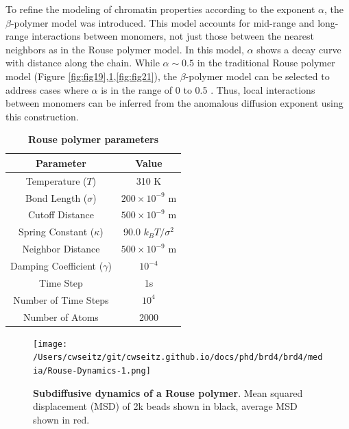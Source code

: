 To refine the modeling of chromatin properties according to the exponent $\alpha$, the $\beta$-polymer model was introduced. This model accounts for mid-range and long-range interactions between monomers, not just those between the nearest neighbors as in the Rouse polymer model. In this model, $\alpha$ shows a decay curve with distance along the chain. While $\alpha \sim 0.5$ in the traditional Rouse polymer model (Figure \ref{fig:fig19},\ref{fig:fig20},\ref{fig:fig21}), the $\beta$-polymer model can be selected to address cases where $\alpha$ is in the range of 0 to 0.5 \parencite{Amitai2013,Amitai2017,Hajjoul2013}. Thus, local interactions between monomers can be inferred from the anomalous diffusion exponent using this construction.

\begin{table}[h!]
\centering
\begin{tabular}{|c|c|}
\hline
\textbf{Parameter} & \textbf{Value} \\ \hline
Temperature ($T$) & 310 K \\ \hline
Bond Length ($\sigma$) & $200 \times 10^{-9}$ m \\ \hline
Cutoff Distance & $500 \times 10^{-9}$ m \\ \hline
Spring Constant ($\kappa$) & 90.0 $k_{B}T/\sigma^2$ \\ \hline
Neighbor Distance & $500 \times 10^{-9}$ m \\ \hline
Damping Coefficient ($\gamma$) & $10^{-4}$ \\ \hline
Time Step & 1s\\ \hline
Number of Time Steps & $10^4$ \\ \hline
Number of Atoms & 2000 \\ \hline
\end{tabular}
\caption{\textbf{Rouse polymer parameters}}
\end{table}

\begin{figure}[t]
\centering
\texttt{[image: /Users/cwseitz/git/cwseitz.github.io/docs/phd/brd4/brd4/media/Rouse-Dynamics-1.png]}
\caption{\textbf{Subdiffusive dynamics of a Rouse polymer}.  Mean squared displacement (MSD) of 2k beads shown in black, average MSD shown in red.}
\label{fig:fig20}
\end{figure}


